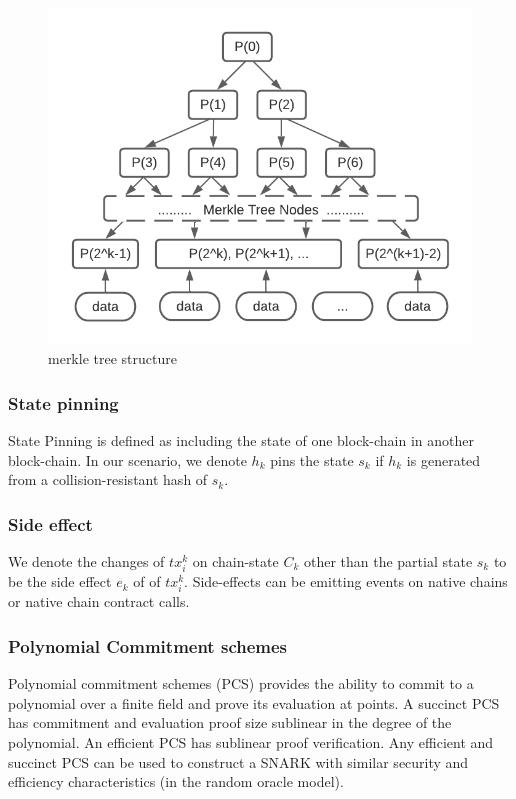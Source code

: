 \documentclass[acmtog, natbib=false]{acmart}
\begin{document}
\begin{figure}[!ht]
\caption{merkle tree structure}
\label{merkle-tree}
\includegraphics[scale=0.6]{merkle-tree}
\end{figure}

\subsubsection{State pinning}
State Pinning\cite{robinson2019anonymous} is defined as including the state of one block-chain in another block-chain. In our scenario, we denote $h_k$ pins the state $s_k$ if $h_k$ is generated from a collision-resistant hash of $s_k$.

\subsubsection{Side effect}
We denote the changes of $tx_i^k$ on chain-state $C_k$ other than the partial state $s_k$ to be the side effect $e_k$ of of $tx_i^k$. Side-effects can be emitting events on native chains or native chain contract calls.

\subsubsection{Polynomial Commitment schemes}
Polynomial commitment schemes (PCS) provides the ability to commit to a polynomial over a finite field and prove its evaluation at points\cite{boneh2021halo}. A succinct PCS has commitment and evaluation proof size sublinear in the degree of the polynomial. An efficient PCS has sublinear proof verification. Any efficient and succinct PCS can be used to construct a SNARK with similar security and efficiency characteristics (in the random oracle model).
\end{document}
